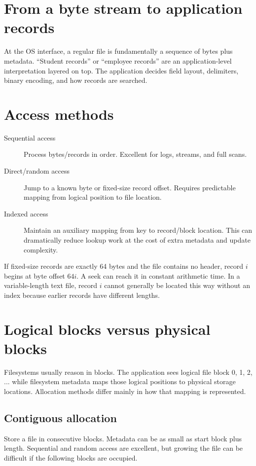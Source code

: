 \section{From a byte stream to application records}
At the OS interface, a regular file is fundamentally a sequence of bytes plus metadata. ``Student records'' or ``employee records'' are an application-level interpretation layered on top. The application decides field layout, delimiters, binary encoding, and how records are searched.

\section{Access methods}
\begin{description}
  \item[Sequential access] Process bytes/records in order. Excellent for logs, streams, and full scans.
  \item[Direct/random access] Jump to a known byte or fixed-size record offset. Requires predictable mapping from logical position to file location.
  \item[Indexed access] Maintain an auxiliary mapping from key to record/block location. This can dramatically reduce lookup work at the cost of extra metadata and update complexity.
\end{description}

\begin{workedexample}
If fixed-size records are exactly 64 bytes and the file contains no header, record $i$ begins at byte offset $64i$. A seek can reach it in constant arithmetic time. In a variable-length text file, record $i$ cannot generally be located this way without an index because earlier records have different lengths.
\end{workedexample}

\section{Logical blocks versus physical blocks}
Filesystems usually reason in blocks. The application sees logical file block 0, 1, 2, ... while filesystem metadata maps those logical positions to physical storage locations. Allocation methods differ mainly in how that mapping is represented.

\subsection{Contiguous allocation}
Store a file in consecutive blocks. Metadata can be as small as start block plus length. Sequential and random access are excellent, but growing the file can be difficult if the following blocks are occupied.

